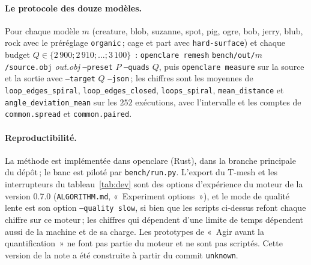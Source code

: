 \documentclass[11pt,a4paper]{article}
\providecommand{\enginecommit}{unknown}
\begin{document}
\paragraph{Le protocole des douze modèles.} Pour chaque modèle $m$
(creature, blob, suzanne, spot, pig, ogre, bob, jerry, blub, rock avec le
préréglage \texttt{organic}\,; cage et part avec \texttt{hard-surface}) et
chaque budget $Q \in \{2\,900 ; 2\,910 ; \dots ; 3\,100\}$~: \texttt{openclare remesh}
\texttt{bench/out/}$m$\texttt{/source.obj} \textit{out.obj}
\texttt{--preset} $P$ \texttt{--quads} $Q$, puis \texttt{openclare measure}
sur la source et la sortie avec \texttt{--target} $Q$ \texttt{--json}\,; les
chiffres sont les moyennes de \texttt{loop\_edges\_spiral},
\texttt{loop\_edges\_closed}, \texttt{loops\_spiral},
\texttt{mean\_distance} et \texttt{angle\_deviation\_mean} sur les $252$
exécutions, avec l'intervalle et les comptes de \texttt{common.spread} et
\texttt{common.paired}.

\paragraph{Reproductibilité.} La méthode est implémentée dans openclare
(Rust), dans la branche principale du dépôt\,; le banc est piloté par
\texttt{bench/run.py}. L'export du T-mesh et les interrupteurs du
tableau~\ref{tab:dev} sont des options d'expérience du moteur de la version
0.7.0 (\texttt{ALGORITHM.md}, «~Experiment options~»), et le mode de
qualité lente est son option \texttt{--quality slow}, si bien que les
scripts ci-dessus refont chaque chiffre sur ce moteur\,; les chiffres qui
dépendent d'une limite de temps dépendent aussi de la machine et de sa
charge. Les prototypes de «~Agir avant la quantification~» ne font pas
partie du moteur et ne sont pas scriptés. Cette version de la note a été
construite à partir du commit \texttt{\enginecommit}.
\end{document}
